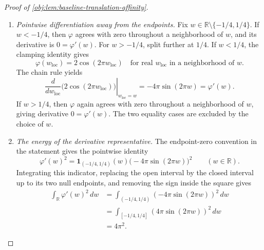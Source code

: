 \begin{proof}[Proof of \cref{obj:lem:baseline-translation-affinity}]
\begin{enumerate}
\item \emph{Pointwise differentiation away from the endpoints.}
Fix \(w\in\mathbb R\setminus\{-1/4,1/4\}\).
If \(w<-1/4\), then \(\varphi\) agrees with zero throughout a neighborhood of \(w\), and its derivative is \(0=\varphi'(w)\).
For \(w>-1/4\), split further at \(1/4\). If \(w<1/4\), the clamping identity gives
\[
\varphi(w_{\mathrm{loc}})=2\cos(2\pi w_{\mathrm{loc}})
\quad\text{for real }w_{\mathrm{loc}}\text{ in a neighborhood of }w.
\]
The chain rule yields
\[
\left.\frac{d}{dw_{\mathrm{loc}}}\bigl(2\cos(2\pi w_{\mathrm{loc}})\bigr)\right|_{w_{\mathrm{loc}}=w}
=-4\pi\sin(2\pi w)=\varphi'(w).
\]
If \(w>1/4\), then \(\varphi\) again agrees with zero throughout a neighborhood of \(w\), giving derivative \(0=\varphi'(w)\). The two equality cases are excluded by the choice of \(w\).

\item \emph{The energy of the derivative representative.}
The endpoint-zero convention in the statement gives the pointwise identity
\[
\varphi'(w)^2
=\mathbf1_{(-1/4,1/4)}(w)
  \bigl(-4\pi\sin(2\pi w)\bigr)^2
\qquad(w\in\mathbb R).
\]
Integrating this indicator, replacing the open interval by the closed interval up to its two null endpoints, and removing the sign inside the square gives
\[
\begin{aligned}
\int_{\mathbb R}\varphi'(w)^2\,dw
&=\int_{(-1/4,1/4)}(-4\pi\sin(2\pi w))^2\,dw\\
&=\int_{[-1/4,1/4]}(4\pi\sin(2\pi w))^2\,dw\\
&=4\pi^2.
\end{aligned}
\]
\end{enumerate}
\end{proof}
